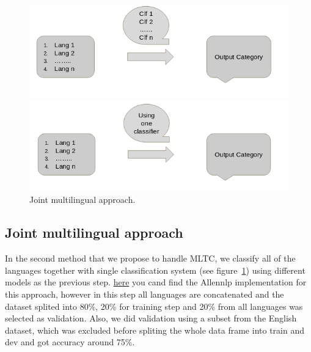 \documentclass[letterpaper,12pt]{article}
\begin{document}
\begin{figure}
	\centering
	\begin{minipage}[b]{.4\textwidth}
		\centering \includegraphics[width=0.8\columnwidth]{4.png}
		
		\caption{
			\label{fig:5} %
			Multiple Monolingual Classification
		}
		
	\end{minipage}\qquad
	\begin{minipage}[b]{.4\textwidth}
		
		\centering \includegraphics[width=0.8\columnwidth]{3.png}
		
		\caption{
			\label{fig:6} %
			Joint multilingual approach.
		}
		
	\end{minipage}
\end{figure}

\subsection{Joint multilingual approach}
In the second method that we propose to handle MLTC, we classify all of the languages together with single classification system (see figure~\ref{fig:6}) using different models as the previous step. \href{https://github.com/nesmaAlmoazamy/Handling_Multilinguality/blob/master/AllenNlp_SingleClassifier_All_RoundTrip.ipynb}{here} you cand find the Allennlp implementation for this approach, however in this step all languages are concatenated and the dataset splited into 80\%, 20\% for training step and 20\% from all languages was selected as validation. Also, we did validation using a subset from the English dataset, which was excluded before spliting the whole data frame into train and dev and got accuracy around 75\%. 
\end{document}
